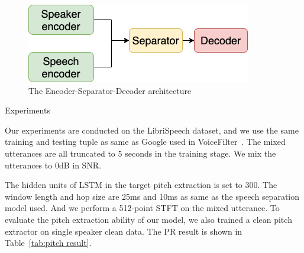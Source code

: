 \documentclass[final]{beamer}
\newlength{\colwidth}
\begin{document}
\begin{frame}[t]
\begin{columns}[t]
\begin{column}{\colwidth}
\begin{block}{}
                    \begin{figure}[!t]
                        \centering
                        \includegraphics[width=0.58\linewidth]{img/encoder_sep_decoder}
                        \caption{The Encoder-Separator-Decoder architecture}
                        \label{fig:enc_sep_doc_arc}
                    \end{figure}

                \end{block}


                \begin{block}{Experiments}

                    Our experiments are conducted on the LibriSpeech dataset, and we use the same training and testing tuple as same as Google used in VoiceFilter~\cite{voicefilter}. The mixed utterances are all truncated to 5 seconds in the training stage. We mix the utterances to 0dB in SNR.


                    The hidden units of LSTM in the target pitch extraction is set to 300. The window length and hop size are 25ms and 10ms as same as the speech separation model used. And we perform a 512-point STFT on the mixed utterance. To evaluate the pitch extraction ability of our model, we also trained a clean pitch extractor on single speaker clean data. The PR result is shown in Table~\ref{tab:pitch result}.


\end{block}
\end{column}
\end{columns}
\end{frame}
\end{document}
